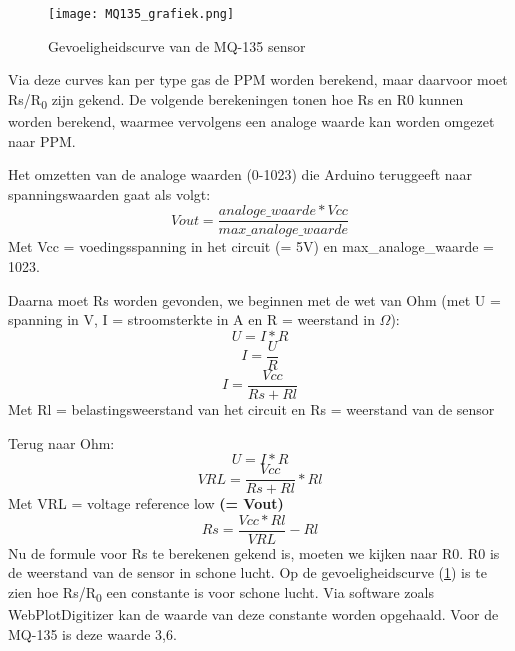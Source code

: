 \begin{figure}[h]
    \texttt{[image: MQ135\_grafiek.png]}
    \caption[Gevoeligheidscurve MQ-135]{Gevoeligheidscurve van de MQ-135 sensor
    }
    \label{fig:MQ135_grafiek}
\end{figure}


Via deze curves kan per type gas de PPM worden berekend, maar daarvoor moet Rs/R\textsubscript{0} zijn gekend. De volgende berekeningen tonen hoe Rs en R0 kunnen worden berekend, waarmee vervolgens een analoge waarde kan worden omgezet naar PPM.

Het omzetten van de analoge waarden (0-1023) die Arduino teruggeeft naar spanningswaarden gaat als volgt:
\begin{equation}
    Vout = \frac{analoge\_waarde * Vcc}{max\_analoge\_waarde}
\end{equation}
Met Vcc = voedingsspanning in het circuit (= 5V) en max\_analoge\_waarde = 1023.

Daarna moet Rs worden gevonden, we beginnen met de wet van Ohm (met U = spanning in V, I = stroomsterkte in A en R = weerstand in $\Omega$):
\begin{equation}
    U = I * R
\end{equation}
\begin{equation}
    I = \frac{U}{R}
\end{equation}
\begin{equation}
    I = \frac{Vcc}{Rs+Rl}
\end{equation}
Met Rl = belastingsweerstand van het circuit en Rs = weerstand van de sensor

Terug naar Ohm:
\begin{equation}
    U = I * R
\end{equation}
\begin{equation}
    VRL = \frac{Vcc}{Rs + Rl} * Rl
\end{equation}
Met VRL = voltage reference low \textbf{(= Vout)}
\begin{equation}
    Rs = \frac{Vcc * Rl}{VRL} - Rl
\end{equation}
Nu de formule voor Rs te berekenen gekend is, moeten we kijken naar R0. R0 is de weerstand van de sensor in schone lucht. Op de gevoeligheidscurve (\ref{fig:MQ135_grafiek}) is te zien hoe Rs/R\textsubscript{0} een constante is voor schone lucht. Via software zoals WebPlotDigitizer
kan de waarde van deze constante worden opgehaald. Voor de MQ-135 is deze waarde 3,6.

